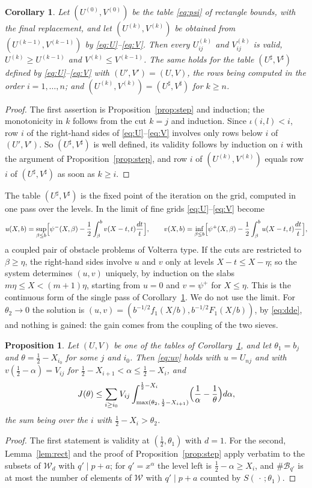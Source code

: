 \documentclass[11pt,a4paper]{amsart}
\newtheorem{proposition}[theorem]{Proposition}
\newtheorem{corollary}[theorem]{Corollary}
\theoremstyle{remark}
\numberwithin{equation}{section}
\newcommand{\cB}{\mathcal B}
\newcommand{\cW}{\mathcal W}
\begin{document}
\begin{corollary}\label{cor:tables}
Let $(U^{(0)},V^{(0)})$ be the table \eqref{eq:psi} of rectangle bounds, with the final replacement, and let
$(U^{(k)},V^{(k)})$ be obtained from $(U^{(k-1)},V^{(k-1)})$ by \eqref{eq:U}--\eqref{eq:V}. Then every
$U^{(k)}_{ij}$ and $V^{(k)}_{ij}$ is valid, $U^{(k)}\ge U^{(k-1)}$ and $V^{(k)}\le V^{(k-1)}$. The same holds for
the table $(U^{\sharp},V^{\sharp})$ defined by \eqref{eq:U}--\eqref{eq:V} with $(U',V')=(U,V)$, the rows being
computed in the order $i=1,\dots,n$; and $(U^{(k)},V^{(k)})=(U^\sharp,V^\sharp)$ for $k\ge n$.
\end{corollary}
\begin{proof}
The first assertion is Proposition~\ref{prop:step} and induction; the monotonicity in $k$ follows from the cut
$k=j$ and induction. Since $\iota(i,l)<i$, row $i$ of the right-hand sides of \eqref{eq:U}--\eqref{eq:V} involves
only rows below $i$ of $(U',V')$. So $(U^\sharp,V^\sharp)$ is well defined, its validity follows by induction on
$i$ with the argument of Proposition~\ref{prop:step}, and row $i$ of $(U^{(k)},V^{(k)})$ equals row $i$ of
$(U^\sharp,V^\sharp)$ as soon as $k\ge i$.
\end{proof}
The table $(U^\sharp,V^\sharp)$ is the fixed point of the iteration on the grid, computed in one pass over the
levels. In the limit of fine grids \eqref{eq:U}--\eqref{eq:V} become
\[
u(X,b)=\sup_{\beta\le b}\Bigl[\psi^-(X,\beta)-\frac12\int_\beta^bv(X-t,t)\frac{dt}t\Bigr],\qquad
v(X,b)=\inf_{\beta\le b}\Bigl[\psi^+(X,\beta)-\frac12\int_\beta^bu(X-t,t)\frac{dt}t\Bigr],
\]
a coupled pair of obstacle problems of Volterra type. If the cuts are restricted to $\beta\ge\eta$, the
right-hand sides involve $u$ and $v$ only at levels $X-t\le X-\eta$; so the system determines $(u,v)$ uniquely,
by induction on the slabs $m\eta\le X<(m+1)\eta$, starting from $u=0$ and $v=\psi^+$ for $X\le\eta$. This is the
continuous form of the single pass of Corollary~\ref{cor:tables}. We do not use the limit. For
$\theta_2\to0$ the solution is $(u,v)=(b^{-1/2}f_1(X/b),b^{-1/2}F_1(X/b))$, by \eqref{eq:dde}, and nothing is
gained: the gain comes from the coupling of the two sieves.

\begin{proposition}\label{prop:uv}
Let $(U,V)$ be one of the tables of Corollary~\ref{cor:tables}, and let $\theta_1=b_j$ and
$\theta=\frac12-X_{i_0}$ for some $j$ and $i_0$. Then \eqref{eq:uv} holds with $u=U_{nj}$ and with
$v(\frac12-\alpha)=V_{ij}$ for $\frac12-X_{i+1}<\alpha\le\frac12-X_i$, and
\[
J(\theta)\le\sum_{i\ge i_0}V_{ij}\int_{\max(\theta_2,\,\frac12-X_{i+1})}^{\frac12-X_i}\Bigl(\frac1\alpha-\frac1\theta\Bigr)d\alpha,
\]
the sum being over the $i$ with $\frac12-X_i>\theta_2$.
\end{proposition}
\begin{proof}
The first statement is validity at $(\frac12,\theta_1)$ with $d=1$. For the second, Lemma~\ref{lem:rect} and the
proof of Proposition~\ref{prop:step} apply verbatim to the subsets of $\cW_d$ with $q'\mid p+a$; for
$q'=x^\alpha$ the level left is $\frac12-\alpha\ge X_i$, and $\#\cB_{q'}$ is at most the number of elements of
$\cW$ with $q'\mid p+a$ counted by $S(\,\cdot\,;\theta_1)$.
\end{proof}
\end{document}
